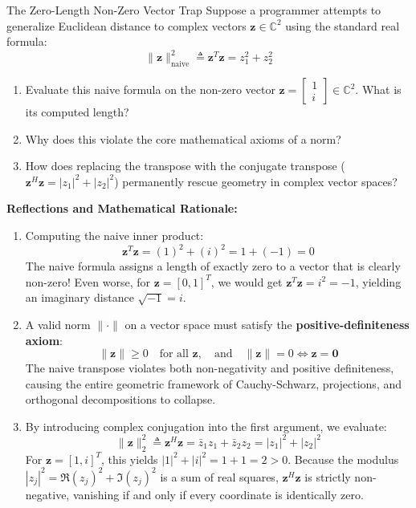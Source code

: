 \begin{ponderbox}{The Zero-Length Non-Zero Vector Trap}
Suppose a programmer attempts to generalize Euclidean distance to complex vectors $\mathbf{z} \in \mathbb{C}^2$ using the standard real formula:
\begin{equation*}
\|\mathbf{z}\|_{\text{naive}}^2 \triangleq \mathbf{z}^T \mathbf{z} = z_1^2 + z_2^2
\end{equation*}
\begin{enumerate}
    \item Evaluate this naive formula on the non-zero vector $\mathbf{z} = \begin{bmatrix} 1 \\ i \end{bmatrix} \in \mathbb{C}^2$. What is its computed length?
    \item Why does this violate the core mathematical axioms of a norm?
    \item How does replacing the transpose with the conjugate transpose ($\mathbf{z}^H \mathbf{z} = |z_1|^2 + |z_2|^2$) permanently rescue geometry in complex vector spaces?
\end{enumerate}
\tcblower
\textbf{Reflections and Mathematical Rationale:}
\begin{enumerate}
    \item Computing the naive inner product:
    \begin{equation*}
    \mathbf{z}^T \mathbf{z} = (1)^2 + (i)^2 = 1 + (-1) = 0
    \end{equation*}
    The naive formula assigns a length of exactly zero to a vector that is clearly non-zero! Even worse, for $\mathbf{z} = [0, 1]^T$, we would get $\mathbf{z}^T \mathbf{z} = i^2 = -1$, yielding an imaginary distance $\sqrt{-1} = i$.
    \item A valid norm $\|\cdot\|$ on a vector space must satisfy the \textbf{positive-definiteness axiom}:
    \begin{equation*}
    \|\mathbf{z}\| \ge 0 \quad \text{for all } \mathbf{z}, \quad \text{and} \quad \|\mathbf{z}\| = 0 \iff \mathbf{z} = \mathbf{0}
    \end{equation*}
    The naive transpose violates both non-negativity and positive definiteness, causing the entire geometric framework of Cauchy-Schwarz, projections, and orthogonal decompositions to collapse.
    \item By introducing complex conjugation into the first argument, we evaluate:
    \begin{equation*}
    \|\mathbf{z}\|_2^2 \triangleq \mathbf{z}^H \mathbf{z} = \bar{z}_1 z_1 + \bar{z}_2 z_2 = |z_1|^2 + |z_2|^2
    \end{equation*}
    For $\mathbf{z} = [1, i]^T$, this yields $|1|^2 + |i|^2 = 1 + 1 = 2 > 0$. Because the modulus $|z_j|^2 = \Re(z_j)^2 + \Im(z_j)^2$ is a sum of real squares, $\mathbf{z}^H \mathbf{z}$ is strictly non-negative, vanishing if and only if every coordinate is identically zero.
\end{enumerate}
\end{ponderbox}

